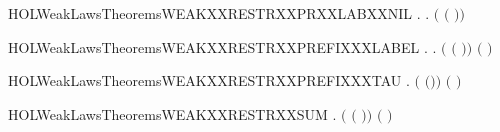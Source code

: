 \begin{SaveVerbatim}{HOLWeakLawsTheoremsWEAKXXRESTRXXPRXXLABXXNIL}
\HOLTokenTurnstile{} \HOLSymConst{\HOLTokenForall{}} .
        \HOLConst{\HOLTokenIn{}}  \HOLSymConst{\HOLTokenDisj{}}   \HOLConst{\HOLTokenIn{}}  \HOLSymConst{\HOLTokenImp{}} \HOLSymConst{\HOLTokenForall{}}.  \ensuremath{(}  \ensuremath{(} \HOLSymConst{\ensuremath{\ldotp}}\ensuremath{)}\ensuremath{)} 
\end{SaveVerbatim}
\newcommand{\HOLWeakLawsTheoremsWEAKXXRESTRXXPRXXLABXXNIL}{\UseVerbatim{HOLWeakLawsTheoremsWEAKXXRESTRXXPRXXLABXXNIL}}
\begin{SaveVerbatim}{HOLWeakLawsTheoremsWEAKXXRESTRXXPREFIXXXLABEL}
\HOLTokenTurnstile{} \HOLSymConst{\HOLTokenForall{}} .
        \HOLConst{\HOLTokenNotIn{}}  \HOLSymConst{\HOLTokenConj{}}   \HOLConst{\HOLTokenNotIn{}}  \HOLSymConst{\HOLTokenImp{}}
       \HOLSymConst{\HOLTokenForall{}}.  \ensuremath{(}  \ensuremath{(} \HOLSymConst{\ensuremath{\ldotp}}\ensuremath{)}\ensuremath{)} \ensuremath{(} \HOLSymConst{\ensuremath{\ldotp}}  \ensuremath{)}
\end{SaveVerbatim}
\newcommand{\HOLWeakLawsTheoremsWEAKXXRESTRXXPREFIXXXLABEL}{\UseVerbatim{HOLWeakLawsTheoremsWEAKXXRESTRXXPREFIXXXLABEL}}
\begin{SaveVerbatim}{HOLWeakLawsTheoremsWEAKXXRESTRXXPREFIXXXTAU}
\HOLTokenTurnstile{} \HOLSymConst{\HOLTokenForall{}} .  \ensuremath{(}  \ensuremath{(}\HOLConst{\ensuremath{\tau}}\HOLSymConst{\ensuremath{\ldotp}}\ensuremath{)}\ensuremath{)} \ensuremath{(}\HOLConst{\ensuremath{\tau}}\HOLSymConst{\ensuremath{\ldotp}}  \ensuremath{)}
\end{SaveVerbatim}
\newcommand{\HOLWeakLawsTheoremsWEAKXXRESTRXXPREFIXXXTAU}{\UseVerbatim{HOLWeakLawsTheoremsWEAKXXRESTRXXPREFIXXXTAU}}
\begin{SaveVerbatim}{HOLWeakLawsTheoremsWEAKXXRESTRXXSUM}
\HOLTokenTurnstile{} \HOLSymConst{\HOLTokenForall{}}  .  \ensuremath{(}  \ensuremath{(} \HOLSymConst{\ensuremath{+}} \ensuremath{)}\ensuremath{)} \ensuremath{(}   \HOLSymConst{\ensuremath{+}}   \ensuremath{)}
\end{SaveVerbatim}
